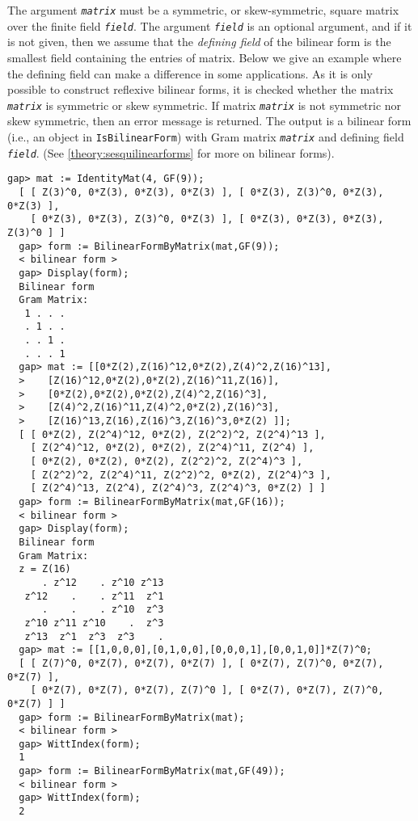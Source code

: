 \documentclass[a4paper,11pt]{report}
\begin{document}
{{{ The argument \mbox{\texttt{\slshape matrix}} must be a symmetric, or skew-symmetric, square matrix over the finite field \mbox{\texttt{\slshape field}}. The argument \mbox{\texttt{\slshape field}} is an optional argument, and if it is not given, then we assume that the \emph{defining field} of the bilinear form is the smallest field containing the entries of matrix.
Below we give an example where the defining field can make a difference in
some applications. As it is only possible to construct reflexive bilinear
forms, it is checked whether the matrix \mbox{\texttt{\slshape matrix}} is symmetric or skew symmetric. If matrix \mbox{\texttt{\slshape matrix}} is not symmetric nor skew symmetric, then an error message is returned. The
output is a bilinear form (i.e., an object in \texttt{IsBilinearForm}) with Gram matrix \mbox{\texttt{\slshape matrix}} and defining field \mbox{\texttt{\slshape field}}. (See \ref{theory:sesquilinearforms} for more on bilinear forms). 
\begin{Verbatim}[fontsize=\small,frame=single,label=Example]
  gap> mat := IdentityMat(4, GF(9));
  [ [ Z(3)^0, 0*Z(3), 0*Z(3), 0*Z(3) ], [ 0*Z(3), Z(3)^0, 0*Z(3), 0*Z(3) ], 
    [ 0*Z(3), 0*Z(3), Z(3)^0, 0*Z(3) ], [ 0*Z(3), 0*Z(3), 0*Z(3), Z(3)^0 ] ]
  gap> form := BilinearFormByMatrix(mat,GF(9));
  < bilinear form >
  gap> Display(form);
  Bilinear form
  Gram Matrix:
   1 . . .
   . 1 . .
   . . 1 .
   . . . 1
  gap> mat := [[0*Z(2),Z(16)^12,0*Z(2),Z(4)^2,Z(16)^13],
  >    [Z(16)^12,0*Z(2),0*Z(2),Z(16)^11,Z(16)],
  >    [0*Z(2),0*Z(2),0*Z(2),Z(4)^2,Z(16)^3],
  >    [Z(4)^2,Z(16)^11,Z(4)^2,0*Z(2),Z(16)^3],
  >    [Z(16)^13,Z(16),Z(16)^3,Z(16)^3,0*Z(2) ]];
  [ [ 0*Z(2), Z(2^4)^12, 0*Z(2), Z(2^2)^2, Z(2^4)^13 ], 
    [ Z(2^4)^12, 0*Z(2), 0*Z(2), Z(2^4)^11, Z(2^4) ], 
    [ 0*Z(2), 0*Z(2), 0*Z(2), Z(2^2)^2, Z(2^4)^3 ], 
    [ Z(2^2)^2, Z(2^4)^11, Z(2^2)^2, 0*Z(2), Z(2^4)^3 ], 
    [ Z(2^4)^13, Z(2^4), Z(2^4)^3, Z(2^4)^3, 0*Z(2) ] ]
  gap> form := BilinearFormByMatrix(mat,GF(16));
  < bilinear form >
  gap> Display(form);
  Bilinear form
  Gram Matrix:
  z = Z(16)
      . z^12    . z^10 z^13
   z^12    .    . z^11  z^1
      .    .    . z^10  z^3
   z^10 z^11 z^10    .  z^3
   z^13  z^1  z^3  z^3    .
  gap> mat := [[1,0,0,0],[0,1,0,0],[0,0,0,1],[0,0,1,0]]*Z(7)^0;
  [ [ Z(7)^0, 0*Z(7), 0*Z(7), 0*Z(7) ], [ 0*Z(7), Z(7)^0, 0*Z(7), 0*Z(7) ], 
    [ 0*Z(7), 0*Z(7), 0*Z(7), Z(7)^0 ], [ 0*Z(7), 0*Z(7), Z(7)^0, 0*Z(7) ] ]
  gap> form := BilinearFormByMatrix(mat);
  < bilinear form >
  gap> WittIndex(form);
  1
  gap> form := BilinearFormByMatrix(mat,GF(49));
  < bilinear form >
  gap> WittIndex(form);
  2
   

\end{Verbatim}}}}
\end{document}
